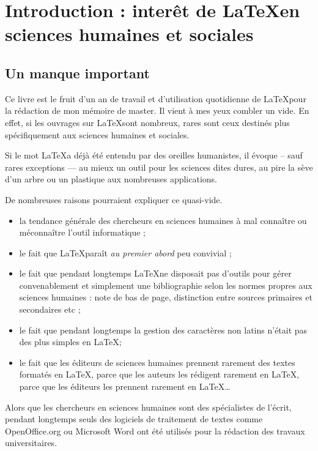 \chapter{Introduction : interêt de \LaTeX en sciences humaines et sociales}

\section{Un manque important}

Ce livre est le fruit d'un an de travail et d'utilisation quotidienne de \LaTeX pour la rédaction de mon mémoire de master. Il vient à mes yeux combler un vide. En effet, si les ouvrages sur \LaTeX sont nombreux, rares sont ceux destinés plus spécifiquement aux sciences humaines et sociales. 

Si le mot \LaTeX a déjà été entendu par des oreilles humanistes, il évoque -- sauf rares exceptions --- au mieux un outil pour les sciences dites dures, au pire la sève d'un arbre ou un plastique aux nombreuses applications. 

De nombreuses raisons pourraient expliquer ce quasi-vide.
\begin{itemize}
\item la tendance générale des chercheurs en sciences humaines à mal connaître ou méconnaître l'outil informatique ;
\item le fait que \LaTeX paraît \emph{au premier abord} peu convivial ;
\item le fait que pendant longtemps \LaTeX ne disposait pas d'outils pour gérer convenablement et simplement une bibliographie selon les normes propres aux sciences humaines : note de bas de page, distinction entre sources primaires et secondaires etc ;
\item le fait que pendant longtemps la gestion des caractères non latins n'était pas des plus simples en \LaTeX ;
\item le fait que les éditeurs de sciences humaines prennent rarement des textes formatés en \LaTeX, parce que les auteurs les rédigent rarement en \LaTeX, parce que les éditeurs les prennent rarement en \LaTeX \ldots
\end{itemize}

Alors que les chercheurs en sciences humaines sont des spécialistes de l'écrit, pendant longtemps seuls des logiciels de traitement de textes comme OpenOffice.org ou Microsoft Word ont été utilisés pour la rédaction des travaux universitaires.

